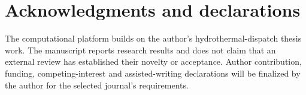\documentclass[11pt]{article}
\theoremstyle{definition}
\theoremstyle{remark}
\begin{document}
\section*{Acknowledgments and declarations}
The computational platform builds on the author's hydrothermal-dispatch thesis work.
The manuscript reports research results and does not claim that an external review has
established their novelty or acceptance. Author contribution, funding, competing-interest
and assisted-writing declarations will be finalized by the author for the selected
journal's requirements.



\end{document}
